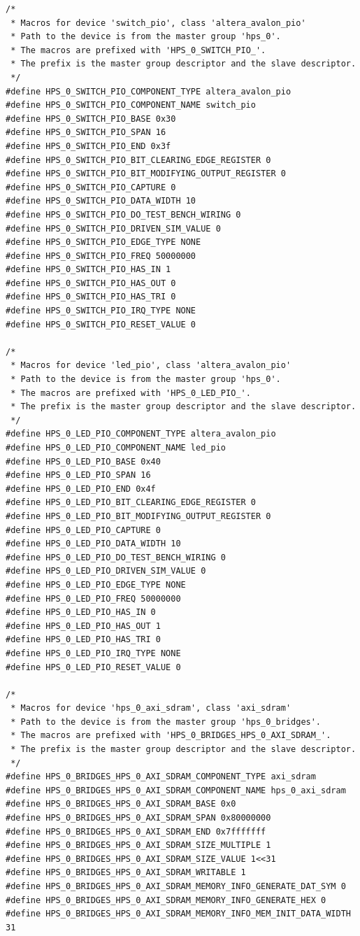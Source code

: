 \documentclass[conference]{IEEEtran}
\begin{document}
\begin{lstlisting}
/*
 * Macros for device 'switch_pio', class 'altera_avalon_pio'
 * Path to the device is from the master group 'hps_0'.
 * The macros are prefixed with 'HPS_0_SWITCH_PIO_'.
 * The prefix is the master group descriptor and the slave descriptor.
 */
#define HPS_0_SWITCH_PIO_COMPONENT_TYPE altera_avalon_pio
#define HPS_0_SWITCH_PIO_COMPONENT_NAME switch_pio
#define HPS_0_SWITCH_PIO_BASE 0x30
#define HPS_0_SWITCH_PIO_SPAN 16
#define HPS_0_SWITCH_PIO_END 0x3f
#define HPS_0_SWITCH_PIO_BIT_CLEARING_EDGE_REGISTER 0
#define HPS_0_SWITCH_PIO_BIT_MODIFYING_OUTPUT_REGISTER 0
#define HPS_0_SWITCH_PIO_CAPTURE 0
#define HPS_0_SWITCH_PIO_DATA_WIDTH 10
#define HPS_0_SWITCH_PIO_DO_TEST_BENCH_WIRING 0
#define HPS_0_SWITCH_PIO_DRIVEN_SIM_VALUE 0
#define HPS_0_SWITCH_PIO_EDGE_TYPE NONE
#define HPS_0_SWITCH_PIO_FREQ 50000000
#define HPS_0_SWITCH_PIO_HAS_IN 1
#define HPS_0_SWITCH_PIO_HAS_OUT 0
#define HPS_0_SWITCH_PIO_HAS_TRI 0
#define HPS_0_SWITCH_PIO_IRQ_TYPE NONE
#define HPS_0_SWITCH_PIO_RESET_VALUE 0

/*
 * Macros for device 'led_pio', class 'altera_avalon_pio'
 * Path to the device is from the master group 'hps_0'.
 * The macros are prefixed with 'HPS_0_LED_PIO_'.
 * The prefix is the master group descriptor and the slave descriptor.
 */
#define HPS_0_LED_PIO_COMPONENT_TYPE altera_avalon_pio
#define HPS_0_LED_PIO_COMPONENT_NAME led_pio
#define HPS_0_LED_PIO_BASE 0x40
#define HPS_0_LED_PIO_SPAN 16
#define HPS_0_LED_PIO_END 0x4f
#define HPS_0_LED_PIO_BIT_CLEARING_EDGE_REGISTER 0
#define HPS_0_LED_PIO_BIT_MODIFYING_OUTPUT_REGISTER 0
#define HPS_0_LED_PIO_CAPTURE 0
#define HPS_0_LED_PIO_DATA_WIDTH 10
#define HPS_0_LED_PIO_DO_TEST_BENCH_WIRING 0
#define HPS_0_LED_PIO_DRIVEN_SIM_VALUE 0
#define HPS_0_LED_PIO_EDGE_TYPE NONE
#define HPS_0_LED_PIO_FREQ 50000000
#define HPS_0_LED_PIO_HAS_IN 0
#define HPS_0_LED_PIO_HAS_OUT 1
#define HPS_0_LED_PIO_HAS_TRI 0
#define HPS_0_LED_PIO_IRQ_TYPE NONE
#define HPS_0_LED_PIO_RESET_VALUE 0

/*
 * Macros for device 'hps_0_axi_sdram', class 'axi_sdram'
 * Path to the device is from the master group 'hps_0_bridges'.
 * The macros are prefixed with 'HPS_0_BRIDGES_HPS_0_AXI_SDRAM_'.
 * The prefix is the master group descriptor and the slave descriptor.
 */
#define HPS_0_BRIDGES_HPS_0_AXI_SDRAM_COMPONENT_TYPE axi_sdram
#define HPS_0_BRIDGES_HPS_0_AXI_SDRAM_COMPONENT_NAME hps_0_axi_sdram
#define HPS_0_BRIDGES_HPS_0_AXI_SDRAM_BASE 0x0
#define HPS_0_BRIDGES_HPS_0_AXI_SDRAM_SPAN 0x80000000
#define HPS_0_BRIDGES_HPS_0_AXI_SDRAM_END 0x7fffffff
#define HPS_0_BRIDGES_HPS_0_AXI_SDRAM_SIZE_MULTIPLE 1
#define HPS_0_BRIDGES_HPS_0_AXI_SDRAM_SIZE_VALUE 1<<31
#define HPS_0_BRIDGES_HPS_0_AXI_SDRAM_WRITABLE 1
#define HPS_0_BRIDGES_HPS_0_AXI_SDRAM_MEMORY_INFO_GENERATE_DAT_SYM 0
#define HPS_0_BRIDGES_HPS_0_AXI_SDRAM_MEMORY_INFO_GENERATE_HEX 0
#define HPS_0_BRIDGES_HPS_0_AXI_SDRAM_MEMORY_INFO_MEM_INIT_DATA_WIDTH 31


\end{lstlisting}
\end{document}
